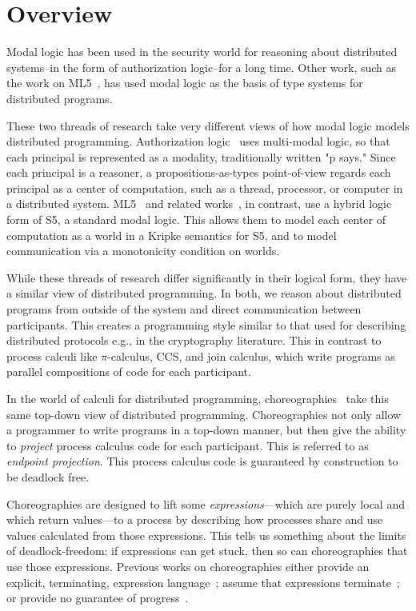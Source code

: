 \documentclass{article}
\theoremstyle{definition}
\begin{document}
\section{Overview}
\label{sec:overview}

Modal logic has been used in the security world for reasoning about distributed systems--in the form of authorization logic--for a long time.
Other work, such as the work on ML5~\citep{MurphyCH07}, has used modal logic as the basis of type systems for distributed programs.

These two threads of research take very different views of how modal logic models distributed programming.
Authorization logic~\citep{HirschACAT20-TR,HirschC13,GenoveseGR12,SchneiderWS11,GenoveseGGP11,GargP10,GargA08,Garg08,Abadi08,GargP06,Abadi03} uses multi-modal logic, so that each principal is represented as a modality, traditionally written "p says."
Since each principal is a reasoner, a propositions-as-types point-of-view regards each principal as a center of computation, such as a thread, processor, or computer in a distributed system.
ML5~\citep{MurphyCH07} and related works~\citep{JiaW04,AhmedJW03}, in contrast, use a hybrid logic form of S5, a standard modal logic.
This allows them to model each center of computation as a world in a Kripke semantics for S5, and to model communication via a monotonicity condition on worlds.

While these threads of research differ significantly in their logical form, they have a similar view of distributed programming.
In both, we reason about distributed programs from outside of the system and direct communication between participants.
This creates a programming style similar to that used for describing distributed protocols e.g., in the cryptography literature.
This in contrast to process calculi like $\pi$-calculus, CCS, and join calculus, which write programs as parallel compositions of code for each participant.

In the world of calculi for distributed programming, choreographies~\citep{Cruz-FilipeM17,Cruz-FilipeMP18,CarboneMS14,Montesi13,ZongyanXCH07,CarboneM13} take this same top-down view of distributed programming.
Choreographies not only allow a programmer to write programs in a top-down manner, but then give the ability to \emph{project} process calculus code for each participant.
This is referred to as \emph{endpoint projection}.
This process calculus code is guaranteed by construction to be deadlock free.

Choreographies are designed to lift some \emph{expressions}---which are purely local and which return values---to a process by describing how processes share and use values calculated from those expressions.
This tells us something about the limits of deadlock-freedom: if expressions can get stuck, then so can choreographies that use those expressions.
Previous works on choreographies either provide an explicit, terminating, expression language~\citep{Cruz-FilipeM17,CarboneMS14,ZongyanXCH07}; assume that expressions terminate~\citep{Cruz-FilipeMP18}; or provide no guarantee of progress~\citep{CarboneM13}.
\end{document}
